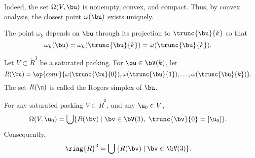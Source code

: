   Indeed,
the set $\Omega(V, \bu)$ is nonempty, convex, and compact.  Thus, by
convex analysis, the closest point $\omega( \bu)$ exists uniquely.

The point $\omega_k$ depends on $\bu$ through its projection to
$\trunc{\bu}{k}$ so that
\[
\omega_k(\bu) = \omega_k(\trunc{\bu}{k})=\omega(\trunc{\bu}{k}).
\]
%

\begin{definition} 
Let $V\subset\ring{R}^3$ be a saturated packing. For $\bu\in \bV(k)$, let 
\begin{displaymath} 
R(\bu) = \op{conv}\{\omega( \trunc{\bu}{0}), \omega(
\trunc{\bu}{1}),\ldots,\omega( \trunc{\bu}{k})\}.
\end{displaymath}
The set $R(\u)$ is called the Rogers simplex of $\bu$.
%
\end{definition}

\begin{lemma}[] 
For any saturated packing $V\subset\ring{R}^3$, and any $\u_0\in V$,
\begin{equation} 
\Omega(V,\u_0) = \bigcup \{ R(\bv) \mid \bv\in \bV(3),~\trunc{\bv}{0} =[\u_0]\}.
\end{equation}
Consequently,
\begin{displaymath}
\ring{R}^3 = \bigcup\, \{ R(\bv) \mid \bv\in\bV(3)\}.
\end{displaymath}
\end{lemma}

